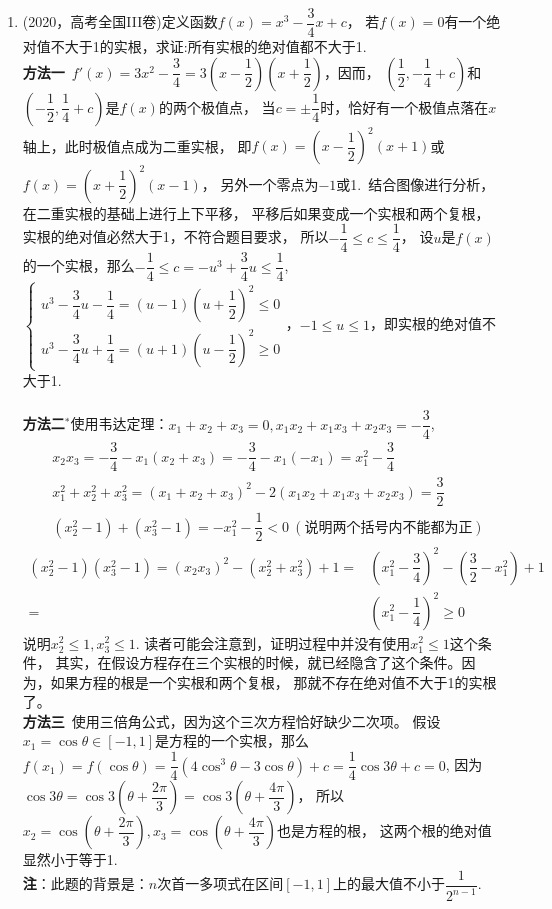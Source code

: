 \begin{enumerate}[label={【\textbf{例\thechapter.\arabic*}】},
 leftmargin=\inteval{\myenumleftmargin}pt,
 itemsep=\inteval{\myenumitempsep}pt,
 itemindent=\inteval{\myenumitemindent}pt]
\item (2020，高考全国III卷)定义函数$ f(x)=x^3-\dfrac{3}{4}x+c $，
若$ f(x)=0 $有一个绝对值不大于1的实根，求证:所有实根的绝对值都不大于1.\\
\textbf{方法一}\ $ f'(x)=3x^2-\dfrac{3}{4}=3(x-\dfrac{1}{2})(x+\dfrac{1}{2}) $，因而，
$ (\dfrac{1}{2},-\dfrac{1}{4}+c) $和$ (-\dfrac{1}{2},\dfrac{1}{4}+c) $是$ f(x) $的两个极值点，
当$ c=\pm \dfrac{1}{4} $时，恰好有一个极值点落在$ x $轴上，此时极值点成为二重实根，
即$ f(x)=\left(x-\dfrac{1}{2} \right)^2(x+1)  $或$ f(x)=\left(x+\dfrac{1}{2} \right)^2(x-1)  $，
另外一个零点为$ -1 $或1.\ 结合图像进行分析，在二重实根的基础上进行上下平移，
平移后如果变成一个实根和两个复根，实根的绝对值必然大于1，不符合题目要求，
所以$ -\dfrac{1}{4}\leq c \leq \dfrac{1}{4} $，%
设$ u $是$ f(x) $的一个实根，那么$ -\dfrac{1}{4}\leq c=-u^3+\dfrac{3}{4}u \leq \dfrac{1}{4} $, 
$ \begin{cases}
    u^3-\dfrac{3}{4}u-\dfrac{1}{4}=(u-1)(u+\dfrac{1}{2})^2 \leq 0 \\
    u^3-\dfrac{3}{4}u+\dfrac{1}{4}=(u+1)(u-\dfrac{1}{2})^2 \geq 0 
\end{cases} $，$ -1 \leq u \leq 1 $，即实根的绝对值不大于1.\\
\\
\textbf{方法二}$ ^* $使用韦达定理：$ x_1+x_2+x_3=0,x_1x_2+x_1x_3+x_2x_3=-\dfrac{3}{4} $,
\begin{align*}
    &  x_2x_3=-\dfrac{3}{4}-x_1(x_2+x_3)=-\dfrac{3}{4}-x_1(-x_1)=x_1^2-\dfrac{3}{4}  \\
    & x_1^2+x_2^2+x_3^2=(x_1+x_2+x_3)^2-2(x_1x_2+x_1x_3+x_2x_3) =\dfrac{3}{2}  \\
    & (x_2^2-1)+(x_3^2-1)=-x_1^2-\dfrac{1}{2} < 0\ (\text{说明两个括号内不能都为正})
\end{align*}
\vspace{-0.7cm}
\begin{align*}
    (x_2^2-1)(x_3^2-1)=(x_2x_3)^2-(x_2^2+x_3^2)+1 = &
    \left( x_1^2-\dfrac{3}{4} \right)^2-\left( \dfrac{3}{2}-x_1^2\right)  +1\\
    = & \left( x_1^2-\dfrac{1}{4}\right) ^2 \geq 0
\end{align*}
说明$ x_2^2\leq 1,x_3^2\leq 1 $. 读者可能会注意到，证明过程中并没有使用$ x_1^2\leq 1 $这个条件，
其实，在假设方程存在三个实根的时候，就已经隐含了这个条件。因为，如果方程的根是一个实根和两个复根，
那就不存在绝对值不大于1的实根了。\\
\textbf{方法三}\ 使用三倍角公式，因为这个三次方程恰好缺少二次项。
假设$ x_1=\cos \theta \in [-1,1] $是方程的一个实根，那么$ f(x_1)
=f(\cos \theta)=\dfrac{1}{4}(4\cos^3 \theta-3\cos \theta)+c=\dfrac{1}{4}\cos3\theta + c=0 $,
因为$ \cos3\theta=\cos3(\theta+\dfrac{2\pi}{3})=\cos3(\theta+\dfrac{4\pi}{3}) $，
所以$ x_2=\cos(\theta+\dfrac{2\pi}{3}),x_3=\cos(\theta+\dfrac{4\pi}{3}) $也是方程的根，
这两个根的绝对值显然小于等于1.  \\
\textbf{注}：此题的背景是：$ n $次首一多项式在区间$ [-1,1] $上的最大值不小于$ \dfrac{1}{2^{n-1}} $.


\end{enumerate}
